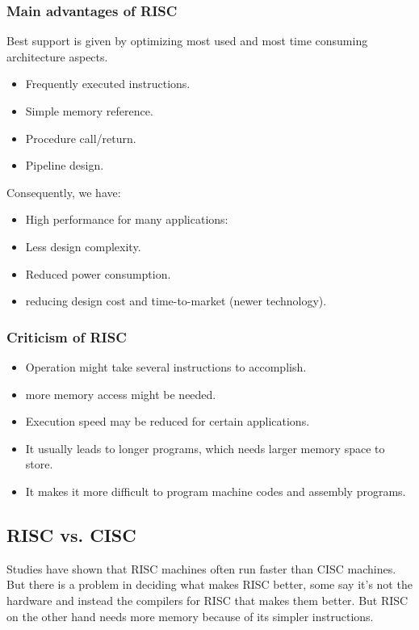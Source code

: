 \subsubsection{Main advantages of RISC}
Best support is given by optimizing most used and most time consuming architecture aspects.
\begin{itemize}

\item Frequently executed instructions.
\item Simple memory reference.
\item Procedure call/return.
\item Pipeline design. \\
\end{itemize}

Consequently, we have:
\begin{itemize}
\item High performance for many applications:
\item Less design complexity.
\item Reduced power consumption.
\item reducing design cost and time-to-market (newer technology).
\end{itemize}
  
\subsubsection{Criticism of RISC}
\begin{itemize}
\item Operation might take several instructions to accomplish.
\item more memory access might be needed.
\item Execution speed may be reduced for certain applications.
\item It usually leads to longer programs, which needs larger memory space to store.
\item It makes it more difficult to program machine codes and assembly programs.
\end{itemize}
  
\subsection{RISC vs. CISC}
Studies have shown that RISC machines often run faster than CISC machines. But there is a problem in deciding what makes RISC better, some say it's not the hardware and instead the compilers for RISC that makes them better. But RISC on the other hand needs more memory because of its simpler instructions.

